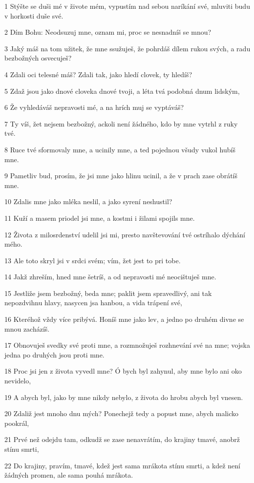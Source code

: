 \par 1 Stýšte se duši mé v živote mém, vypustím nad sebou naríkání své, mluviti budu v horkosti duše své.
\par 2 Dím Bohu: Neodsuzuj mne, oznam mi, proc se nesnadníš se mnou?
\par 3 Jaký máš na tom užitek, že mne ssužuješ, že pohrdáš dílem rukou svých, a radu bezbožných osvecuješ?
\par 4 Zdali oci telesné máš? Zdali tak, jako hledí clovek, ty hledíš?
\par 5 Zdaž jsou jako dnové cloveka dnové tvoji, a léta tvá podobná dnum lidským,
\par 6 Že vyhledáváš nepravosti mé, a na hrích muj se vyptáváš?
\par 7 Ty víš, žet nejsem bezbožný, ackoli není žádného, kdo by mne vytrhl z ruky tvé.
\par 8 Ruce tvé sformovaly mne, a ucinily mne, a ted pojednou všudy vukol hubíš mne.
\par 9 Pametliv bud, prosím, že jsi mne jako hlinu ucinil, a že v prach zase obrátíš mne.
\par 10 Zdalis mne jako mléka neslil, a jako syrení neshustil?
\par 11 Kuží a masem priodel jsi mne, a kostmi i žilami spojils mne.
\par 12 Života z milosrdenství udelil jsi mi, presto navštevování tvé ostríhalo dýchání mého.
\par 13 Ale toto skryl jsi v srdci svém; vím, žet jest to pri tobe.
\par 14 Jakž zhreším, hned mne šetríš, a od nepravosti mé neocištuješ mne.
\par 15 Jestliže jsem bezbožný, beda mne; paklit jsem spravedlivý, ani tak nepozdvihnu hlavy, nasycen jsa hanbou, a vida trápení své,
\par 16 Kteréhož vždy více pribývá. Honíš mne jako lev, a jedno po druhém divne se mnou zacházíš.
\par 17 Obnovuješ svedky své proti mne, a rozmnožuješ rozhnevání své na mne; vojska jedna po druhých jsou proti mne.
\par 18 Proc jsi jen z života vyvedl mne? Ó bych byl zahynul, aby mne bylo ani oko nevidelo,
\par 19 A abych byl, jako by mne nikdy nebylo, z života do hrobu abych byl vnesen.
\par 20 Zdaliž jest mnoho dnu mých? Ponechejž tedy a popust mne, abych malicko pookrál,
\par 21 Prvé než odejdu tam, odkudž se zase nenavrátím, do krajiny tmavé, anobrž stínu smrti,
\par 22 Do krajiny, pravím, tmavé, kdež jest sama mrákota stínu smrti, a kdež není žádných promen, ale sama pouhá mrákota.

